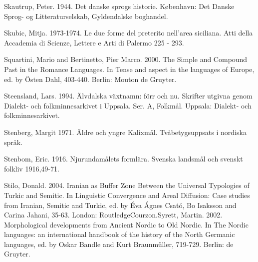 \begin{styleBodytextC}
Skautrup, Peter. 1944. Det danske sprogs historie. København: Det Danske Sprog- og Litteraturselskab, Gyldendalske boghandel.

\end{styleBodytextC}

\begin{styleBodytextC}
Skubic, Mitja. 1973-1974. Le due forme del preterito nell'area siciliana. Atti della Accademia di Scienze, Lettere e Arti di Palermo 225 - 293.

\end{styleBodytextC}

\begin{styleBodytextC}
Squartini, Mario and Bertinetto, Pier Marco. 2000. The Simple and Compound Past in the Romance Languages. In Tense and aspect in the languages of Europe, ed. by Östen Dahl, 403-440. Berlin: Mouton de Gruyter.

\end{styleBodytextC}

\begin{styleBodytextC}
Steensland, Lars. 1994. Älvdalska växtnamn: förr och nu. Skrifter utgivna genom Dialekt- och folkminnesarkivet i Uppsala. Ser. A, Folkmål. Uppsala: Dialekt- och folkminnesarkivet.

\end{styleBodytextC}

\begin{styleBodytextC}
Stenberg, Margit 1971. Äldre och yngre Kalixmål. Tvåbetygsuppsats i nordiska språk.

\end{styleBodytextC}

\begin{styleBodytextC}
Stenbom, Eric. 1916. Njurundamålets formlära. Svenska landsmål och svenskt folkliv 1916,49-71.

\end{styleBodytextC}

\begin{styleBodytextC}
Stilo, Donald. 2004. Iranian as Buffer Zone Between the Universal Typologies of Turkic and Semitic. In Linguistic Convergence and Areal Diffusion: Case studies from Iranian, Semitic and Turkic, ed. by Éva Ágnes Csató, Bo Isaksson and Carina Jahani, 35-63. London: RoutledgeCourzon.Syrett, Martin. 2002. Morphological developments from Ancient Nordic to Old Nordic. In The Nordic languages: an international handbook of the history of the North Germanic languages, ed. by Oskar Bandle and Kurt Braunmüller, 719-729. Berlin: de Gruyter.

\end{styleBodytextC}


